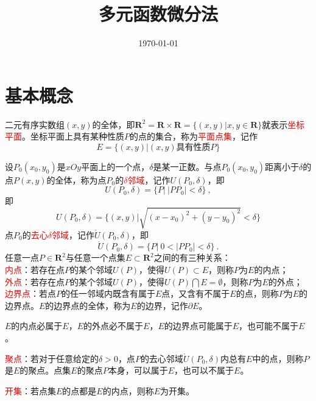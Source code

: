 \documentclass[12pt,a4paper]{article}
\title{多元函数微分法}
\author{}
\date{\today}
\renewcommand{\vec}[1]{\boldsymbol{#1}}
\begin{document}
\maketitle

\section{基本概念}

二元有序实数组$(x, y)$的全体，即$\vec{R}^2 = \vec{R} \times \vec{R} = \{(x, y) | x, y \in \vec{R} \}$就表示\textcolor{red}{坐标平面}。坐标平面上具有某种性质$P$的点的集合，称为\textcolor{red}{平面点集}，记作
\begin{equation}
E = \{(x, y) | (x, y) \text{具有性质} P \}
\end{equation}

设$P_0(x_0, y_0)$是$xOy$平面上的一个点，$\delta$是某一正数。与点$P_0(x_0, y_0)$距离小于$\delta$的点$P(x, y)$的全体，称为点$P_0$的\textcolor{red}{$\delta$邻域}，记作$U(P_0, \delta)$，即
\begin{equation*}
U(P_0, \delta) = \{P |~ |P P_0| < \delta \} ~,
\end{equation*}
即
\begin{equation*}
U(P_0, \delta) = \{(x, y) | \sqrt{(x-x_0)^2 +(y-y_0)^2 }  < \delta \}
\end{equation*}
点$P_0$的\textcolor{red}{去心$\delta$邻域}，记作$\mathring{U}(P_0, \delta)$，即
\begin{equation*}
\mathring U(P_0, \delta) = \{P |~ 0 < |P P_0| < \delta \} ~.
\end{equation*}
任意一点$P\in \vec{R}^2$与任意一个点集$E \subset \vec{R}^2$之间的有三种关系：\\
\textcolor{red}{内点}：若存在点$P$的某个邻域$U(P)$，使得$U(P) \subset E$，则称$P$为$E$的内点；\\
\textcolor{red}{外点}：若存在点$P$的某个邻域$U(P)$，使得$U(P) \bigcap E = \emptyset$，则称$P$为$E$的外点；\\
\textcolor{red}{边界点}：若点$P$的任一邻域内既含有属于$E$点，又含有不属于$E$的点，则称$P$为$E$的边界点。$E$的边界点的全体，称为$E$的边界，记作$\partial E$。

$E$的内点必属于$E$，$E$的外点必不属于$E$，$E$的边界点可能属于$E$，也可能不属于$E$。

\textcolor{red}{聚点}：若对于任意给定的$\delta > 0$，点$P$的去心邻域$\mathring U(P_0, \delta)$内总有$E$中的点，则称$P$是$E$的聚点。点集$E$的聚点$P$本身，可以属于$E$，也可以不属于$E$。


\textcolor{red}{开集}：若点集$E$的点都是$E$的内点，则称$E$为开集。
\end{document}
